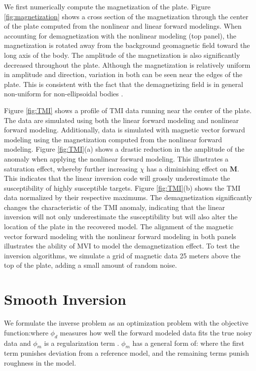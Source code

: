 \documentclass{segabs}
\begin{document}


We first numerically compute the magnetization of the plate. Figure \ref{fig:magnetization} shows a cross section of the magnetization through the center of the plate computed from the nonlinear and linear forward modelings. When accounting for demagnetization with the nonlinear modeling (top panel), the magnetization is rotated away from the background geomagnetic field toward the long axis of the body. The amplitude of the magnetization is also significantly decreased throughout the plate. Although the magnetization is relatively uniform in amplitude and direction, variation in both can be seen near the edges of the plate. This is consistent with the fact that the demagnetizing field is in general non-uniform for non-ellipsoidal bodies \citep{Clark2014}.

Figure \ref{fig:TMI} shows a profile of TMI data running near the center of the plate. The data are simulated using both the linear forward modeling and nonlinear forward modeling. Additionally, data is simulated with magnetic vector forward modeling using the magnetization computed from the nonlinear forward modeling.  Figure \ref{fig:TMI}(a) shows a drastic reduction in the amplitude of the anomaly when applying the nonlinear forward modeling. This illustrates a saturation effect, whereby further increasing $\chi$ has a diminishing effect on $\mathbf{M}$. This indicates that the linear inversion code will grossly underestimate the susceptibility of highly susceptible targets. Figure \ref{fig:TMI}(b) shows the TMI data normalized by their respective maximums. The demagnetization significantly changes the characteristic of the TMI anomaly, indicating that the linear inversion will not only underestimate the susceptibility but will also alter the location of the plate in the recovered model. The alignment of the magnetic vector forward modeling with the nonlinear forward modeling in both panels illustrates the ability of MVI to model the demagnetization effect. To test the inversion algorithms, we simulate a grid of magnetic data 25 meters above the top of the plate, adding a small amount of random noise.

\vspace{-0.45cm}
\section{Smooth Inversion}
\vspace{-0.25cm}

 We formulate the inverse problem as an optimization problem with the objective function:where $\phi_d$ measures how well the forward modeled data fits the true noisy data and $\phi_m$ is a regularization term  \citep{Oldenburg2005,Tikhonov1977}. $\phi_m$ has a general form of:
where the first term punishes deviation from a reference model, and the remaining terms punish roughness in the model.
\end{document}
